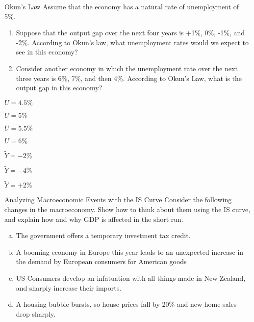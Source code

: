 \documentclass[8pt]{extarticle}
\begin{document}
  \begin{problem}{Okun's Law}
    Assume that the economy has a natural rate of unemployment of 5\%.
    \begin{enumerate}
      \item Suppose that the output gap over the next four years is +1\%, 0\%, -1\%, and -2\%. According to Okun’s law, what unemployment rates would we expect to see in this economy?
      \item Consider another economy in which the unemployment rate over the next three years is 6\%, 7\%, and then 4\%. According to Okun’s Law, what is the output gap in this economy?
    \end{enumerate}
    \tcblower
    \begin{tcolorbox}[colback = white, title = (a), breakable]
      \begin{description}[font = \normalfont]
        \item[$\tilde{Y} = +1\%$:] $U = 4.5\%$
        \item[$\tilde{Y} = 0\%$:] $U = 5\%$
        \item[$\tilde{Y} = -1\%$:] $U = 5.5\%$
        \item[$\tilde{Y} = -2\%$:] $U = 6\%$
      \end{description}
    \end{tcolorbox}
    \begin{tcolorbox}[colback = white, title = (b), breakable]
      \begin{description}[font=\normalfont]
        \item[$U = 6\%$:] $\tilde{Y} = -2\%$
        \item[$U = 7\%$:] $\tilde{Y} = -4\%$
        \item[$U = 4\%$:] $\tilde{Y} = +2\%$
      \end{description}
    \end{tcolorbox}
  \end{problem}
  \begin{problem}{Analyzing Macroeconomic Events with the IS Curve}
    Consider the following changes in the macroeconomy. Show how to think about them using the IS curve, and explain how and why GDP is affected in the short run.
    \begin{enumerate}[(a)]
      \item The government offers a temporary investment tax credit.
      \item A booming economy in Europe this year leads to an unexpected increase in the demand by European consumers for American goods
      \item US Consumers develop an infatuation with all things made in New Zealand, and sharply increase their imports.
      \item A housing bubble bursts, so house prices fall by 20\% and new home sales drop sharply.
    \end{enumerate}
  \end{problem}
\end{document}
